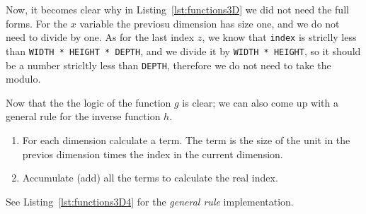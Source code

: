 Now, it becomes clear why in Listing~\ref{lst:functions3D} we did not need the full forms.
For the $x$ variable the previosu dimension has size one, and we do not need to divide by one.
As for the last index $z$, we know that \texttt{index} is striclly less than \texttt{WIDTH * HEIGHT * DEPTH}, and we divide it by \texttt{WIDTH * HEIGHT}, so it should be a number stricltly less than \texttt{DEPTH}, therefore we do not need to take the modulo.

Now that the the logic of the function $g$ is clear; we can also come up with a general rule for the inverse function $h$.

\begin{enumerate}
  \item For each dimension calculate a term. The term is the size of the unit in the previos dimension times the index in the current dimension.
  \item Accumulate (add) all the terms to calculate the real index.
\end{enumerate}

See Listing~\ref{lst:functions3D4} for the \emph{general rule} implementation.

{\centering
\begin{minipage}{\linewidth}
\end{minipage}
\par
}
